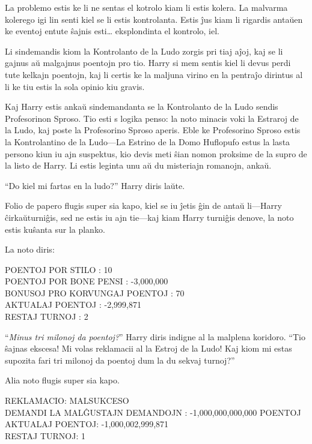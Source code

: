 La problemo estis ke li ne sentas el kotrolo kiam li estis kolera. La
malvarma kolerego igi lin senti kiel se li estis kontrolanta. Estis
ĵus kiam li rigardis antaŭen ke eventoj entute ŝajnis esti\ldots
eksplondinta el kontrolo, iel.

Li sindemandis kiom la Kontrolanto de la Ludo zorgis pri tiaj aĵoj,
kaj se li gajnus aŭ malgajnus poentojn pro tio. Harry si mem sentis
kiel li devus perdi tute kelkajn poentojn, kaj li certis ke la maljuna
virino en la pentraĵo dirintus al li ke tiu estis la sola opinio kiu
gravis.

Kaj Harry estis ankaŭ sindemandanta se la Kontrolanto de la Ludo
sendis Profesorinon Sproso. Tio esti s logika penso: la noto minacis
voki la Estraroj de la Ludo, kaj poste la Profesorino Sproso
aperis. Eble ke Profesorino Sproso estis la Kontrolantino de la
Ludo—La Estrino de la Domo Huflopufo estus la lasta persono kiun iu
ajn suspektus, kio devis meti ŝian nomon proksime de la supro de la
listo de Harry. Li estis leginta unu aŭ du misteriajn romanojn, ankaŭ.

``Do kiel mi fartas en la ludo?'' Harry diris laŭte.

Folio de papero flugis super sia kapo, kiel se iu ĵetis ĝin de antaŭ
li—Harry ĉirkaŭturniĝis, sed ne estis iu ajn tie—kaj kiam Harry
turniĝis denove, la noto estis kuŝanta sur la planko.

La noto diris:

\begin{center}
  POENTOJ POR STILO : 10 \\
  POENTOJ POR BONE PENSI : -3,000,000 \\
  BONUSOJ PRO KORVUNGAJ POENTOJ  : 70 \\
  AKTUALAJ POENTOJ : -2,999,871\\
  RESTAJ TURNOJ : 2\\
\end{center}

``\emph{Minus tri milonoj da poentoj?}'' Harry diris indigne al la
malplena koridoro. ``Tio ŝajnas ekscesa! Mi volas reklamacii al la
Estroj de la Ludo! Kaj kiom mi estas supozita fari tri milonoj da
poentoj dum la du sekvaj turnoj?''

Alia noto flugis super sia kapo.

\begin{center}
  REKLAMACIO: MALSUKCESO \\
  DEMANDI LA MALĜUSTAJN DEMANDOJN : -1,000,000,000,000 POENTOJ\\
  AKTUALAJ POENTOJ: -1,000,002,999,871\\
  RESTAJ TURNOJ: 1
\end{center}

